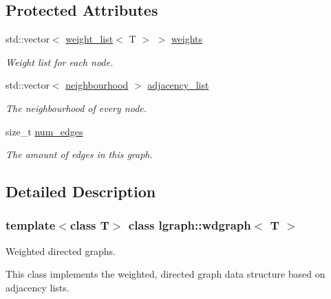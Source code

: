 \subsection*{Protected Attributes}
\begin{DoxyCompactItemize}
\item 
std\+::vector$<$ \hyperlink{namespacelgraph_a1e0fd5ef0a78b2a92da48adbed265cb6}{weight\+\_\+list}$<$ T $>$ $>$ \hyperlink{classlgraph_1_1wxgraph_a6f8c983edc82913c2d78b7bc871defe8}{weights}
\begin{DoxyCompactList}\small\item\em Weight list for each node. \end{DoxyCompactList}\item 
\mbox{\label{classlgraph_1_1xxgraph_a31cf82d0b20be05290be259dc97a51ec}} 
std\+::vector$<$ \hyperlink{namespacelgraph_a052e7766c13f3a43cec0aec8173fdede}{neighbourhood} $>$ \hyperlink{classlgraph_1_1xxgraph_a31cf82d0b20be05290be259dc97a51ec}{adjacency\+\_\+list}
\begin{DoxyCompactList}\small\item\em The neighbourhood of every node. \end{DoxyCompactList}\item 
\mbox{\label{classlgraph_1_1xxgraph_a6765a9a3be42f6e0f824635c593b35d7}} 
size\+\_\+t \hyperlink{classlgraph_1_1xxgraph_a6765a9a3be42f6e0f824635c593b35d7}{num\+\_\+edges}
\begin{DoxyCompactList}\small\item\em The amount of edges in this graph. \end{DoxyCompactList}\end{DoxyCompactItemize}


\subsection{Detailed Description}
\subsubsection*{template$<$class T$>$\newline
class lgraph\+::wdgraph$<$ T $>$}

Weighted directed graphs. 

This class implements the weighted, directed graph data structure based on adjacency lists.


